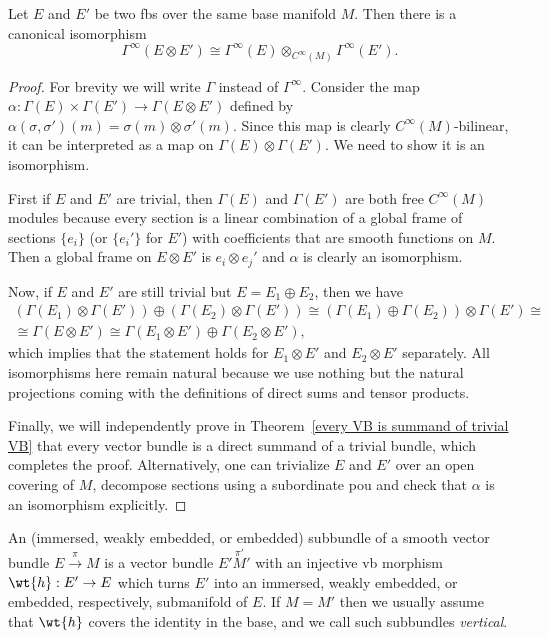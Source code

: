 \begin{prop}\label{sections of tensor products}
    Let $E$ and $E'$ be two \glspl{fb} over the same base manifold $M$. Then there is a canonical isomorphism
    \[\Gamma^\infty(E\otimes E')\cong \Gamma^\infty(E)\otimes_{C^\infty(M)}\Gamma^\infty(E').\]
\end{prop}
\begin{proof}
    For brevity we will write $\Gamma$ instead of $\Gamma^\infty$. Consider the map $\alpha:\Gamma(E)\times\Gamma(E')\to\Gamma(E\otimes E')$ defined by $\alpha(\sigma,\sigma')(m)=\sigma(m)\otimes\sigma'(m)$. Since this map is clearly $C^\infty(M)$-bilinear, it can be interpreted as a map on $\Gamma(E)\otimes\Gamma(E')$. We need to show it is an isomorphism.
    
    First if $E$ and $E'$ are trivial, then $\Gamma(E)$ and $\Gamma(E')$ are both free $C^\infty(M)$ modules because every section is a linear combination of a global frame of sections $\{e_i\}$ (or $\{e_i'\}$ for $E'$) with coefficients that are smooth functions on $M$. Then a global frame on $E\otimes E'$ is $e_i\otimes e_j'$ and $\alpha$ is clearly an isomorphism.
    
    Now, if $E$ and $E'$ are still trivial but $E=E_1\oplus E_2$, then we have 
    \begin{multline}
        (\Gamma(E_1)\otimes\Gamma(E'))\oplus(\Gamma(E_2)\otimes\Gamma(E'))\cong (\Gamma(E_1)\oplus\Gamma(E_2))\otimes\Gamma(E')\cong\\ \cong \Gamma(E\otimes E')\cong \Gamma(E_1\otimes E')\oplus\Gamma(E_2\otimes E'),
    \end{multline}
    which implies that the statement holds for $E_1\otimes E'$ and $E_2\otimes E'$ separately. All isomorphisms here remain natural because we use nothing but the natural projections coming with the definitions of direct sums and tensor products.
    
    Finally, we will independently prove in Theorem~\ref{every VB is summand of trivial VB} that every vector bundle is a direct summand of a trivial bundle, which completes the proof. Alternatively, one can trivialize $E$ and $E'$ over an open covering of $M$, decompose sections using a subordinate \gls{pou} and check that $\alpha$ is an isomorphism explicitly.
\end{proof}



\begin{defn}
    An (immersed, weakly embedded, or embedded) subbundle of a smooth vector bundle $E\overset{\pi}{\to}M$ is a vector bundle $E'\overset{\pi'}M'$ with an injective \gls{vb} morphism $\wt{h}:E'\to E$ which turns $E'$ into an immersed, weakly embedded, or embedded, respectively, submanifold of $E$. If $M=M'$ then we usually assume that $\wt{h}$ covers the identity in the base, and we call such subbundles \emph{vertical}. 
\end{defn}

